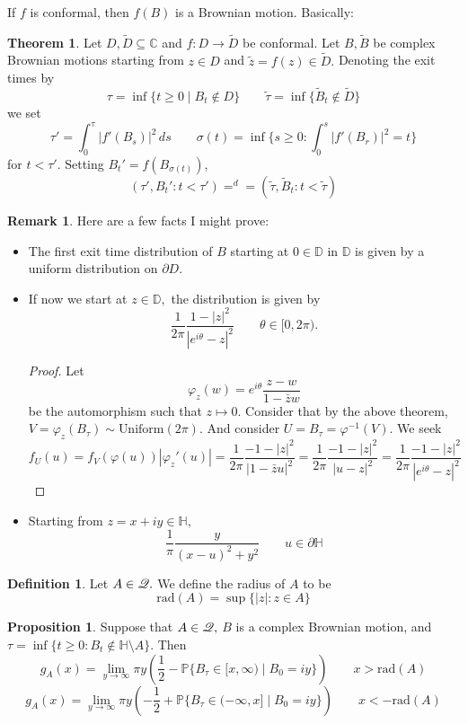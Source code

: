 \documentclass[10pt, oneside]{article}
\newcommand{\bbC}{\mathbb{C}}
\newcommand{\bbP}{\mathbb{P}}
\newcommand{\rad}{\text{rad}}
\newcommand{\sm}{\setminus}
\theoremstyle{definition}
\newtheorem{thm}{Theorem}
\newtheorem{defn}{Definition}
\newtheorem{prop}{Proposition}
\newtheorem{rem}{Remark}
\newcommand{\bbC}{\mathbb{C}}
\newcommand{\bbD}{\mathbb{D}}
\newcommand{\bbH}{\mathbb{H}}
\newcommand{\bbP}{\mathbb{P}}
\newcommand{\sm}{\setminus}
\begin{document}
If $f$ is conformal, then $f(B)$ is a Brownian motion. Basically:
\begin{thm}
    Let $D, \tilde{D}\subseteq \bbC$ and $f: D\to \tilde{D}$ be conformal. Let $B, \tilde{B}$ be complex Brownian motions starting from $z\in D$ and $\tilde{z}= f(z) \in \tilde{D}.$ Denoting the exit times by 
    \[\tau = \inf\{t\geq 0 \mid B_t \notin D\} \qquad \tilde{\tau} = \inf\{\tilde{B}_t \notin \tilde{D}\}\]  we set 
    \[\tau' = \int_0^\tau |f'(B_s)|^2 \,ds \qquad \sigma(t) = \inf\{s\geq 0 : \int_0^s |f'(B_r)|^2 = t\}\] for $t< \tau'$. Setting $B_t' = f(B_{\sigma(t)})$, 
    \[(\tau', B_t' : t< \tau ') =^d= (\tilde{\tau}, \tilde{B}_t: t< \tilde{\tau})\]
\end{thm}
\begin{rem}
    Here are a few facts I might prove:
    \begin{itemize}
        \item The first exit time distribution of $B$ starting at $0 \in \bbD$ in $\bbD$ is given by a uniform distribution on $\partial D.$
        \item If now we start at $z\in \bbD,$ the distribution is given by 
        \[\frac{1}{2\pi} \frac{1 - |z|^2}{|e^{i\theta}- z|^2}\qquad \theta \in [0,2\pi).\]
        \begin{proof}
            Let 
            \[\varphi_z(w) = e^{i\theta}\frac{z-w}{1-\bar z w}\] be the automorphism such that $z\mapsto 0.$ Consider that by the above theorem, $V = \varphi_z(B_\tau) \sim \text{Uniform}(2\pi).$ And consider $U = B_\tau = \varphi^{-1}(V).$ We seek 
            \[f_U(u) = f_V(\varphi(u))\left|\varphi_z'(u)\right| = \frac{1}{2\pi} \frac{-1 - |z|^2}{|1 - \bar z u|^2} = \frac{1}{2\pi} \frac{-1 - |z|^2}{|u-z|^2} = \frac{1}{2\pi}\frac{-1 - |z|^2}{|e^{i\theta} - z|^2}\]
        \end{proof}
        \item Starting from $z = x + iy \in \bbH,$ 
        \[\frac{1}{\pi} \frac{y}{(x- u)^2 + y^2} \qquad u \in \partial \bbH\]
    \end{itemize}
\end{rem}

\begin{defn}
    Let $A\in \cal Q.$ We define the radius of $A$ to be 
    \[\rad(A) =\sup\{|z| : z \in A\}\]
\end{defn}

\begin{prop}
    Suppose that $A\in \cal Q,$ $B$ is a complex Brownian motion, and $\tau = \inf \{t \geq 0 : B_t \notin \bbH \sm A\}.$ Then 
    \[g_A(x) = \lim_{y\to \infty} \pi y\left(\frac{1}{2} - \bbP\{B_\tau \in [x, \infty) \mid B_0 = iy\}\right) \qquad x>\rad (A)\]
    \[g_A(x) = \lim_{y\to \infty} \pi y\left(-\frac{1}{2}+ \bbP\{B_\tau \in (-\infty, x] \mid B_0 = iy\}\right) \qquad x<-\rad (A)\]
\end{prop}
\end{document}

